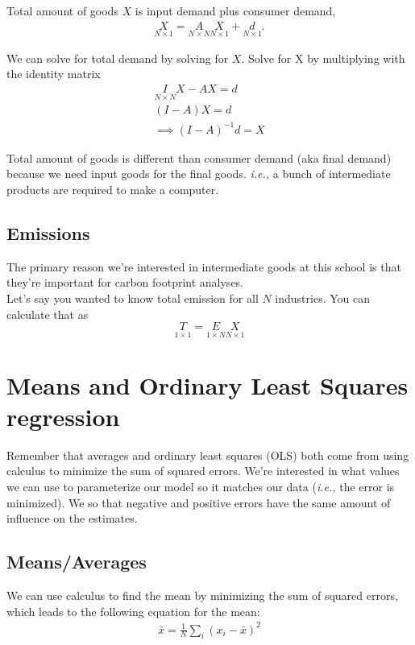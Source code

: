 \documentclass{article}
\begin{document}
Total amount of goods $X$ is input demand plus consumer demand, 
\begin{align}
    \underset{N \times 1}{X} = \underset{N \times N}{A} \underset{N \times 1}{X} + \underset{N \times 1}{d}. 
 \end{align}

We can solve for total demand by solving for $X$. Solve for X by multiplying with the identity matrix 
\begin{align}
    \underset{N \times N}{I} X - AX = d\\
    (I - A) X = d\\
    \implies (I - A)^{-1}d = X
\end{align}

Total amount of goods is different than consumer demand (aka final demand) because we need input goods for the final goods. \textit{i.e.,} a bunch of intermediate products are required to make a computer. 

\subsection{Emissions}
The primary reason we're interested in intermediate goods at this school is that they're important for carbon footprint analyses. \\

Let's say you wanted to know total emission for all $N$ industries. You can calculate that as 
\[\underset{1 \times 1}{T} = \underset{1 \times N}{E} \underset{N\times1}{X} \]

\section{Means and Ordinary Least Squares regression}

Remember that averages and ordinary least squares (OLS) both come from using calculus to minimize the sum of squared errors. We're interested in what values we can use to parameterize our model so it matches our data (\textit{i.e.,} the error is minimized). We so that negative and positive errors have the same amount of influence on the estimates. 

\subsection{Means/Averages}

We can use calculus to find the mean by minimizing the sum of squared errors, which leads to the following equation for the mean: 
\begin{align}
    \bar x = \frac{1}{N} \sum_i (x_i - \bar x)^2 
\end{align}
\end{document}
